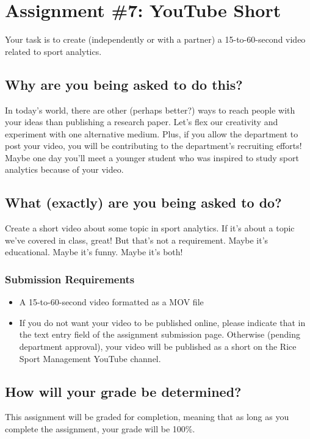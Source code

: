 \documentclass{article}
\begin{document}
  \section*{\sc Assignment \#7: YouTube Short}

    Your task is to create (independently or with a partner) a 15-to-60-second video related to sport analytics.
  
    \subsection*{\sc Why are you being asked to do this?}

      In today's world, there are other (perhaps better?) ways to reach people with your ideas than publishing a research paper. Let's flex our creativity and experiment with one alternative medium. Plus, if you allow the department to post your video, you will be contributing to the department's recruiting efforts! Maybe one day you'll meet a younger student who was inspired to study sport analytics because of your video.

    \subsection*{\sc What (exactly) are you being asked to do?}

      Create a short video about some topic in sport analytics. If it's about a topic we've covered in class, great! But that's not a requirement. Maybe it's educational. Maybe it's funny. Maybe it's both!
      
      \subsubsection*{\sc Submission Requirements}

        \begin{itemize}
          \item A 15-to-60-second video formatted as a MOV file
          \item If you do not want your video to be published online, please indicate that in the text entry field of the assignment submission page. Otherwise (pending department approval), your video will be published as a short on the Rice Sport Management YouTube channel.
        \end{itemize}

    \subsection*{\sc How will your grade be determined?}
      
    This assignment will be graded for completion, meaning that as long as you complete the assignment, your grade will be 100\%.
\end{document}
